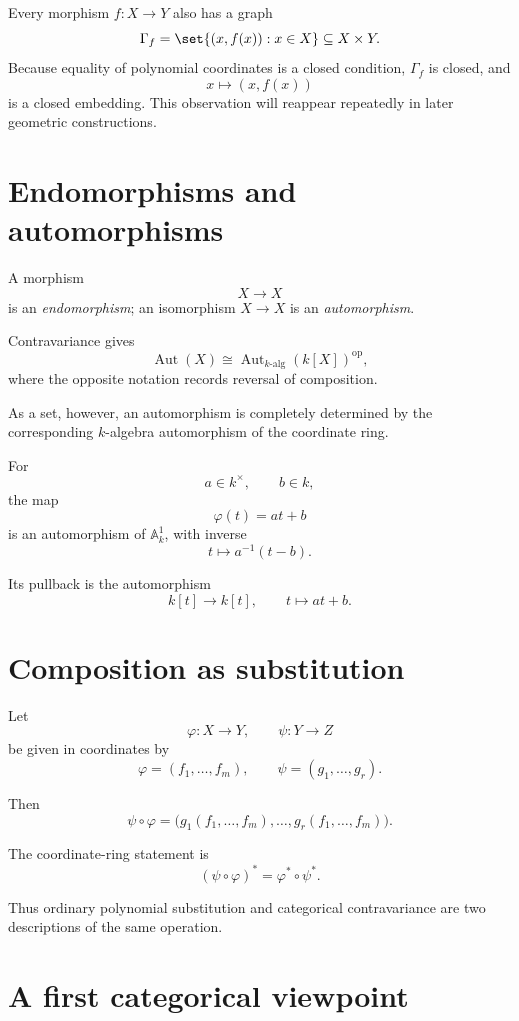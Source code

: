 Every morphism \(f:X\to Y\) also has a graph
\[
\Gamma_f=\set{(x,f(x)):x\in X}\subseteq X\times Y.
\]
Because equality of polynomial coordinates is a closed condition, \(\Gamma_f\) is closed,
and
\[
x\longmapsto(x,f(x))
\]
is a closed embedding.  This observation will reappear repeatedly in later geometric
constructions.

\section{Endomorphisms and automorphisms}

A morphism
\[
X\to X
\]
is an \emph{endomorphism}; an isomorphism \(X\to X\) is an \emph{automorphism}.

Contravariance gives
\[
\operatorname{Aut}(X)
\cong
\operatorname{Aut}_{k\text{-alg}}(k[X])^{\mathrm{op}},
\]
where the opposite notation records reversal of composition.

As a set, however, an automorphism is completely determined by the corresponding
\(k\)-algebra automorphism of the coordinate ring.

\begin{example}
For
\[
a\in k^\times,\qquad b\in k,
\]
the map
\[
\varphi(t)=at+b
\]
is an automorphism of \(\mathbb A_k^1\), with inverse
\[
t\mapsto a^{-1}(t-b).
\]

Its pullback is the automorphism
\[
k[t]\to k[t],
\qquad
t\mapsto at+b.
\]
\end{example}

\section{Composition as substitution}

Let
\[
\varphi:X\to Y,
\qquad
\psi:Y\to Z
\]
be given in coordinates by
\[
\varphi=(f_1,\dots,f_m),
\qquad
\psi=(g_1,\dots,g_r).
\]

Then
\[
\psi\circ\varphi
=
\bigl(
g_1(f_1,\dots,f_m),
\dots,
g_r(f_1,\dots,f_m)
\bigr).
\]

The coordinate-ring statement is
\[
(\psi\circ\varphi)^\ast
=
\varphi^\ast\circ\psi^\ast.
\]

Thus ordinary polynomial substitution and categorical contravariance are two descriptions
of the same operation.

\section{A first categorical viewpoint}

